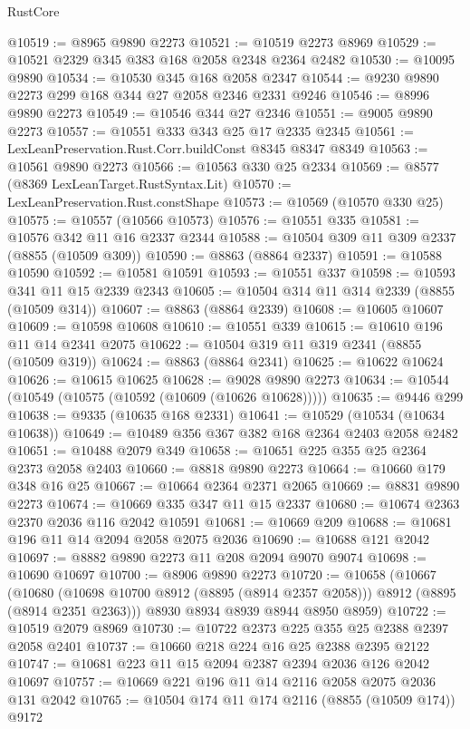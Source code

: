 \begin{lexlean}{RustCore}
\begin{coremodule}
@10519 := @8965 @9890 @2273
@10521 := @10519 @2273 @8969
@10529 := @10521 @2329 @345 @383 @168 @2058 @2348 @2364 @2482
@10530 := @10095 @9890
@10534 := @10530 @345 @168 @2058 @2347
@10544 := @9230 @9890 @2273 @299 @168 @344 @27 @2058 @2346 @2331 @9246
@10546 := @8996 @9890 @2273
@10549 := @10546 @344 @27 @2346
@10551 := @9005 @9890 @2273
@10557 := @10551 @333 @343 @25 @17 @2335 @2345
@10561 := LexLeanPreservation.Rust.Corr.buildConst @8345 @8347 @8349
@10563 := @10561 @9890 @2273
@10566 := @10563 @330 @25 @2334
@10569 := @8577 (@8369 LexLeanTarget.RustSyntax.Lit)
@10570 := LexLeanPreservation.Rust.constShape
@10573 := @10569 (@10570 @330 @25)
@10575 := @10557 (@10566 @10573)
@10576 := @10551 @335
@10581 := @10576 @342 @11 @16 @2337 @2344
@10588 := @10504 @309 @11 @309 @2337 (@8855 (@10509 @309))
@10590 := @8863 (@8864 @2337)
@10591 := @10588 @10590
@10592 := @10581 @10591
@10593 := @10551 @337
@10598 := @10593 @341 @11 @15 @2339 @2343
@10605 := @10504 @314 @11 @314 @2339 (@8855 (@10509 @314))
@10607 := @8863 (@8864 @2339)
@10608 := @10605 @10607
@10609 := @10598 @10608
@10610 := @10551 @339
@10615 := @10610 @196 @11 @14 @2341 @2075
@10622 := @10504 @319 @11 @319 @2341 (@8855 (@10509 @319))
@10624 := @8863 (@8864 @2341)
@10625 := @10622 @10624
@10626 := @10615 @10625
@10628 := @9028 @9890 @2273
@10634 := @10544 (@10549 (@10575 (@10592 (@10609 (@10626 @10628)))))
@10635 := @9446 @299
@10638 := @9335 (@10635 @168 @2331)
@10641 := @10529 (@10534 (@10634 @10638))
@10649 := @10489 @356 @367 @382 @168 @2364 @2403 @2058 @2482
@10651 := @10488 @2079 @349
@10658 := @10651 @225 @355 @25 @2364 @2373 @2058 @2403
@10660 := @8818 @9890 @2273
@10664 := @10660 @179 @348 @16 @25
@10667 := @10664 @2364 @2371 @2065
@10669 := @8831 @9890 @2273
@10674 := @10669 @335 @347 @11 @15 @2337
@10680 := @10674 @2363 @2370 @2036 @116 @2042 @10591
@10681 := @10669 @209
@10688 := @10681 @196 @11 @14 @2094 @2058 @2075 @2036
@10690 := @10688 @121 @2042
@10697 := @8882 @9890 @2273 @11 @208 @2094 @9070 @9074
@10698 := @10690 @10697
@10700 := @8906 @9890 @2273
@10720 := @10658
    (@10667
      (@10680 (@10698 @10700 @8912 (@8895 (@8914 @2357 @2058))) @8912 (@8895 (@8914 @2351 @2363)))
      @8930
      @8934
      @8939
      @8944
      @8950
      @8959)
@10722 := @10519 @2079 @8969
@10730 := @10722 @2373 @225 @355 @25 @2388 @2397 @2058 @2401
@10737 := @10660 @218 @224 @16 @25 @2388 @2395 @2122
@10747 := @10681 @223 @11 @15 @2094 @2387 @2394 @2036 @126 @2042 @10697
@10757 := @10669 @221 @196 @11 @14 @2116 @2058 @2075 @2036 @131 @2042
@10765 := @10504 @174 @11 @174 @2116 (@8855 (@10509 @174)) @9172

\end{coremodule}
\end{lexlean}
